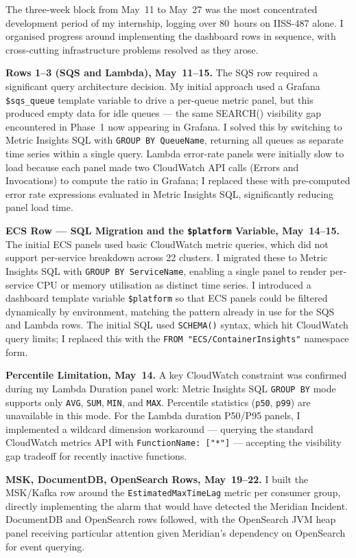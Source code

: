 The three-week block from May~11 to May~27 was the most concentrated development
period of my internship, logging over 80~hours on IISS-487 alone. I organised progress
around implementing the dashboard rows in sequence, with cross-cutting
infrastructure problems resolved as they arose.

\textbf{Rows 1--3 (SQS and Lambda), May~11--15.} The SQS row required a
significant query architecture decision. My initial approach used a Grafana
\texttt{\$sqs\_queue} template variable to drive a per-queue metric panel, but
this produced empty data for idle queues --- the same SEARCH() visibility gap
encountered in Phase~1 now appearing in Grafana. I solved this by switching to
Metric Insights SQL with \texttt{GROUP BY QueueName}, returning all queues as
separate time series within a single query. Lambda error-rate panels were
initially slow to load because each panel made two CloudWatch API calls
(Errors and Invocations) to compute the ratio in Grafana; I replaced these
with pre-computed error rate expressions evaluated in Metric Insights SQL,
significantly reducing panel load time.

\textbf{ECS Row --- SQL Migration and the \texttt{\$platform} Variable, May~14--15.}
The initial ECS panels used basic CloudWatch metric queries, which did not
support per-service breakdown across 22 clusters. I migrated these to
Metric Insights SQL with \texttt{GROUP BY ServiceName}, enabling a single
panel to render per-service CPU or memory utilisation as distinct time series.
I introduced a dashboard template variable \texttt{\$platform} so that ECS
panels could be filtered dynamically by environment, matching the pattern
already in use for the SQS and Lambda rows. The initial SQL used
\texttt{SCHEMA()} syntax, which hit CloudWatch query limits; I replaced this
with the \texttt{FROM "ECS/ContainerInsights"} namespace form.

\textbf{Percentile Limitation, May~14.} A key CloudWatch constraint was
confirmed during my Lambda Duration panel work: Metric Insights SQL \texttt{GROUP BY}
mode supports only \texttt{AVG}, \texttt{SUM}, \texttt{MIN}, and \texttt{MAX}.
Percentile statistics (\texttt{p50}, \texttt{p99}) are unavailable in this mode.
For the Lambda duration P50/P95 panels, I implemented a wildcard dimension workaround
--- querying the standard CloudWatch metrics API with
\texttt{FunctionName:~["*"]} --- accepting the visibility gap tradeoff for
recently inactive functions.

\textbf{MSK, DocumentDB, OpenSearch Rows, May~19--22.} I built the MSK/Kafka row
around the \texttt{EstimatedMaxTimeLag} metric per consumer group,
directly implementing the alarm that would have detected the Meridian Incident.
DocumentDB and OpenSearch rows followed, with the OpenSearch JVM heap panel
receiving particular attention given Meridian's dependency on OpenSearch for
event querying.


